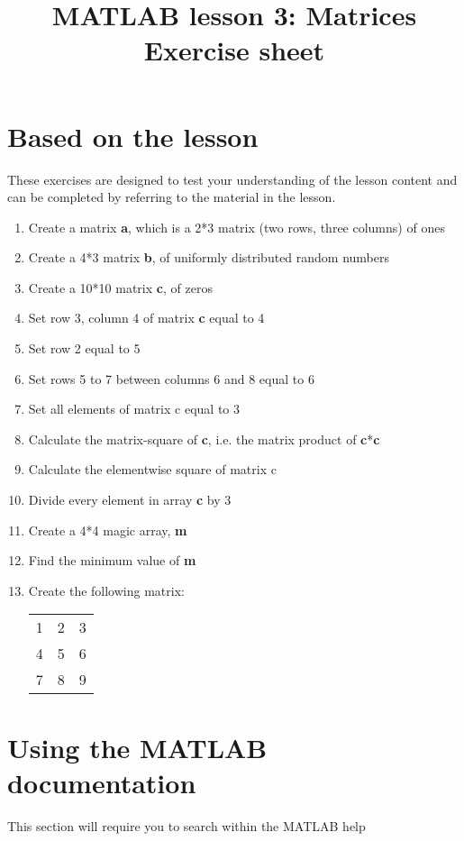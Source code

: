 \documentclass[a4paper]{article}
\title{MATLAB lesson 3: Matrices\\Exercise sheet}
\date{}
\begin{document}
\maketitle

\section{Based on the lesson}
{\large These exercises are designed to test your understanding of the lesson content and can be completed by referring to the material in the lesson.}
\begin{enumerate}
	\item Create a matrix \textbf{a}, which is a 2*3 matrix (two rows, three columns) of ones
	\item Create a 4*3 matrix \textbf{b}, of uniformly distributed random numbers
	\item Create a 10*10 matrix \textbf{c}, of zeros
	\item Set row 3, column 4 of matrix \textbf{c} equal to 4
	\item Set row 2 equal to 5
	\item Set rows 5 to 7 between columns 6 and 8 equal to 6
	\item Set all elements of matrix c equal to 3
	\item Calculate the matrix-square of \textbf{c}, i.e. the matrix product of \textbf{c}*\textbf{c}
	\item Calculate the elementwise square of matrix c
	\item Divide every element in array \textbf{c} by 3
	\item Create a 4*4 magic array, \textbf{m}
	\item Find the minimum value of \textbf{m}
	\item Create the following matrix:
		\begin{table}[h!]
			\centering
			\begin{tabular}{ccc}
				1 & 2 & 3\\
				4 & 5 & 6\\
				7 & 8 & 9\\
			\end{tabular}
		\end{table}	
\end{enumerate}

\pagebreak

\section{Using the MATLAB documentation}
{\large This section will require you to search within the MATLAB help}
\end{document}
